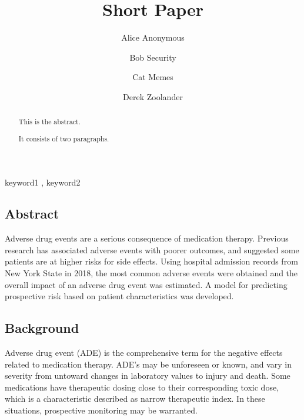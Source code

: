 \documentclass[preprint, 3p,
authoryear]{elsarticle} %
\begin{document}
\begin{frontmatter}

  \title{Short Paper}
    \author[Some Institute of Technology]{Alice Anonymous%
  }
    \author[Another University]{Bob Security}
    \author[Another University]{Cat Memes%
  }
    \author[Some Institute of Technology]{Derek Zoolander%
  }
  
  \begin{abstract}
  This is the abstract.

  It consists of two paragraphs.
  \end{abstract}
    \begin{keyword}
    keyword1 \sep 
    keyword2
  \end{keyword}
  
 \end{frontmatter}

\hypertarget{abstract}{%
\subsection{Abstract}\label{abstract}}

Adverse drug events are a serious consequence of medication therapy.
Previous research has associated adverse events with poorer outcomes,
and suggested some patients are at higher risks for side effects. Using
hospital admission records from New York State in 2018, the most common
adverse events were obtained and the overall impact of an adverse drug
event was estimated. A model for predicting prospective risk based on
patient characteristics was developed.

\hypertarget{background}{%
\subsection{Background}\label{background}}

Adverse drug event (ADE) is the comprehensive term for the negative
effects related to medication therapy. ADE's may be unforeseen or known,
and vary in severity from untoward changes in laboratory values to
injury and death. Some medications have therapeutic dosing close to
their corresponding toxic dose, which is a characteristic described as
narrow therapeutic index. In these situations, prospective monitoring
may be warranted.
\end{document}
